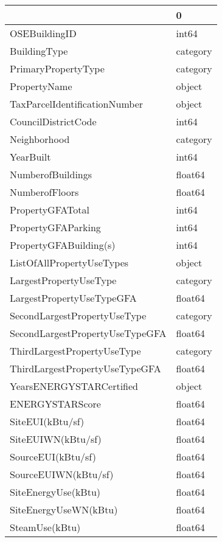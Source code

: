 \begin{tabular}{ll}
\toprule
{} &         0 \\
\midrule
OSEBuildingID                   &     int64 \\
BuildingType                    &  category \\
PrimaryPropertyType             &  category \\
PropertyName                    &    object \\
TaxParcelIdentificationNumber   &    object \\
CouncilDistrictCode             &     int64 \\
Neighborhood                    &  category \\
YearBuilt                       &     int64 \\
NumberofBuildings               &   float64 \\
NumberofFloors                  &   float64 \\
PropertyGFATotal                &     int64 \\
PropertyGFAParking              &     int64 \\
PropertyGFABuilding(s)          &     int64 \\
ListOfAllPropertyUseTypes       &    object \\
LargestPropertyUseType          &  category \\
LargestPropertyUseTypeGFA       &   float64 \\
SecondLargestPropertyUseType    &  category \\
SecondLargestPropertyUseTypeGFA &   float64 \\
ThirdLargestPropertyUseType     &  category \\
ThirdLargestPropertyUseTypeGFA  &   float64 \\
YearsENERGYSTARCertified        &    object \\
ENERGYSTARScore                 &   float64 \\
SiteEUI(kBtu/sf)                &   float64 \\
SiteEUIWN(kBtu/sf)              &   float64 \\
SourceEUI(kBtu/sf)              &   float64 \\
SourceEUIWN(kBtu/sf)            &   float64 \\
SiteEnergyUse(kBtu)             &   float64 \\
SiteEnergyUseWN(kBtu)           &   float64 \\
SteamUse(kBtu)                  &   float64 \\

\end{tabular}

